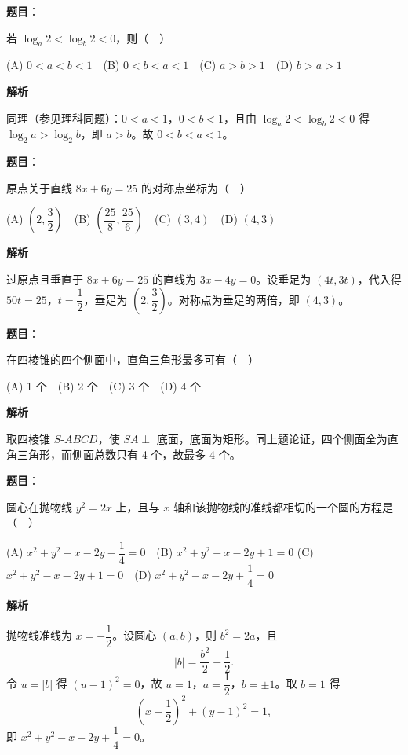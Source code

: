 \begin{answer}

\textbf{题目}：

若 \(\log_a 2<\log_b 2<0\)，则（　）

(A) \(0<a<b<1\)　(B) \(0<b<a<1\)　(C) \(a>b>1\)　(D) \(b>a>1\)

\textbf{解析}

同理（参见理科同题）：\(0<a<1\)，\(0<b<1\)，且由 \(\log_a2<\log_b2<0\) 得 \(\log_2a>\log_2b\)，即 \(a>b\)。故 \(0<b<a<1\)。


\end{answer}
\begin{answer}

\textbf{题目}：

原点关于直线 \(8x+6y=25\) 的对称点坐标为（　）

(A) \(\left(2,\dfrac{3}{2}\right)\)　(B) \(\left(\dfrac{25}{8},\dfrac{25}{6}\right)\)　(C) \((3,4)\)　(D) \((4,3)\)

\textbf{解析}

过原点且垂直于 \(8x+6y=25\) 的直线为 \(3x-4y=0\)。设垂足为 \((4t,3t)\)，代入得 \(50t=25\)，\(t=\dfrac12\)，垂足为 \(\left(2,\dfrac32\right)\)。对称点为垂足的两倍，即 \((4,3)\)。


\end{answer}
\begin{answer}

\textbf{题目}：

在四棱锥的四个侧面中，直角三角形最多可有（　）

(A) 1 个　(B) 2 个　(C) 3 个　(D) 4 个

\textbf{解析}

取四棱锥 \(S\text{-}ABCD\)，使 \(SA\perp\) 底面，底面为矩形。同上题论证，四个侧面全为直角三角形，而侧面总数只有 4 个，故最多 4 个。


\end{answer}
\begin{answer}

\textbf{题目}：

圆心在抛物线 \(y^2=2x\) 上，且与 \(x\) 轴和该抛物线的准线都相切的一个圆的方程是（　）

(A) \(x^2+y^2-x-2y-\dfrac{1}{4}=0\)　(B) \(x^2+y^2+x-2y+1=0\)
(C) \(x^2+y^2-x-2y+1=0\)　(D) \(x^2+y^2-x-2y+\dfrac{1}{4}=0\)

\textbf{解析}

抛物线准线为 \(x=-\dfrac12\)。设圆心 \((a,b)\)，则 \(b^2=2a\)，且
\nopagebreak[4]
\[
|b|=\frac{b^2}{2}+\frac12.
\]
令 \(u=|b|\) 得 \((u-1)^2=0\)，故 \(u=1\)，\(a=\dfrac12\)，\(b=\pm1\)。取 \(b=1\) 得
\nopagebreak[4]
\[
\left(x-\frac12\right)^2+(y-1)^2=1,
\]
即 \(x^2+y^2-x-2y+\dfrac14=0\)。


\end{answer}
